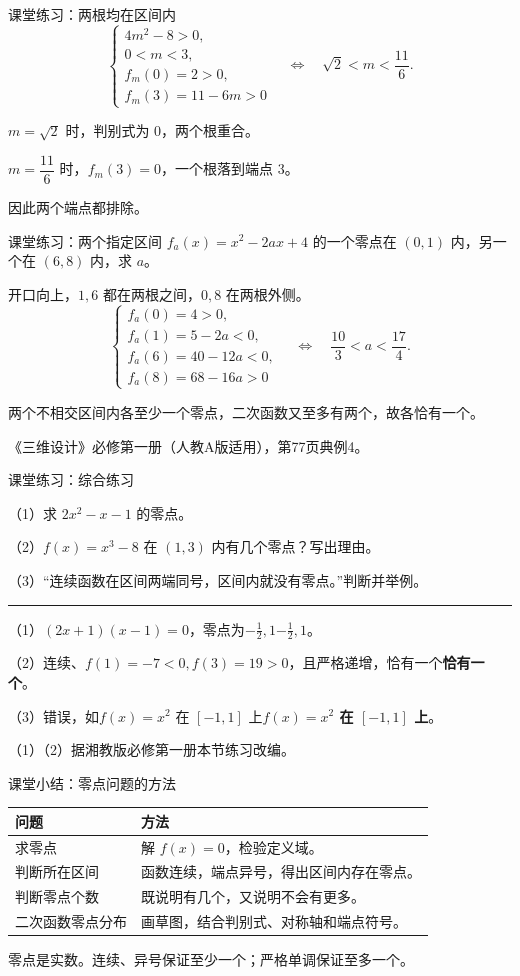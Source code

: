 \documentclass[aspectratio=169,10pt,handout]{beamer}
\newcommand{\key}[1]{{\ifmmode#1\else\bfseries #1\fi}}
\newcommand{\src}[1]{\par\vfill{\color{gray}\scriptsize #1}\par}
\newcommand{\gap}{\par\vspace{2mm}}
\begin{document}
\begin{frame}[t]{课堂练习：两根均在区间内}
  \large
  \[\begin{cases}
    4m^2-8>0,\\
    0<m<3,\\
    f_m(0)=2>0,\\
    f_m(3)=11-6m>0
  \end{cases}
  \quad\Longleftrightarrow\quad\boxed{\sqrt2<m<\frac{11}{6}}.\]
  \pause
  \gap
  $m=\sqrt2$ 时，判别式为 $0$，两个根重合。
  \gap
  $m=\dfrac{11}{6}$ 时，$f_m(3)=0$，一个根落到端点 $3$。
  \gap 因此两个端点都排除。
\end{frame}

\begin{frame}[t]{课堂练习：两个指定区间}
  \large
  $f_a(x)=x^2-2ax+4$ 的一个零点在 $(0,1)$ 内，另一个在 $(6,8)$ 内，求 $a$。
  \pause
  \gap
  开口向上，$1,6$ 都在两根之间，$0,8$ 在两根外侧。
  \[\begin{cases}
    f_a(0)=4>0,\\
    f_a(1)=5-2a<0,\\
    f_a(6)=40-12a<0,\\
    f_a(8)=68-16a>0
  \end{cases}
  \quad\Longleftrightarrow\quad\boxed{\frac{10}{3}<a<\frac{17}{4}}.\]
  \pause
  \gap
  两个不相交区间内各至少一个零点，二次函数又至多有两个，故各恰有一个。
  \src{《三维设计》必修第一册（人教A版适用），第77页典例4。}
\end{frame}

\begin{frame}[t]{课堂练习：综合练习}
  \large
  \par（1）求 $2x^2-x-1$ 的零点。
  \gap
  \par（2）$f(x)=x^3-8$ 在 $(1,3)$ 内有几个零点？写出理由。
  \gap
  \par（3）“连续函数在区间两端同号，区间内就没有零点。”判断并举例。
  \pause
  \gap\hrule\gap
  （1）$(2x+1)(x-1)=0$，零点为\key{$-\frac12,1$}。
  \par（2）连续、$f(1)=-7<0,f(3)=19>0$，且严格递增，\key{恰有一个}。
  \par（3）错误，如\key{$f(x)=x^2$ 在 $[-1,1]$ 上}。
  \src{（1）（2）据湘教版必修第一册本节练习改编。}
\end{frame}

\begin{frame}[t]{课堂小结：零点问题的方法}
  \large
  \begin{tabular}{p{3.4cm}p{9.4cm}}\toprule
    问题 & 方法\\\midrule
    求零点 & 解 $f(x)=0$，检验定义域。\\[3mm]
    判断所在区间 & 函数连续，端点异号，得出区间内存在零点。\\[3mm]
    判断零点个数 & 既说明有几个，又说明不会有更多。\\[3mm]
    二次函数零点分布 & 画草图，结合判别式、对称轴和端点符号。\\\bottomrule
  \end{tabular}
  \gap
  零点是实数。连续、异号保证至少一个；严格单调保证至多一个。
\end{frame}
\end{document}
